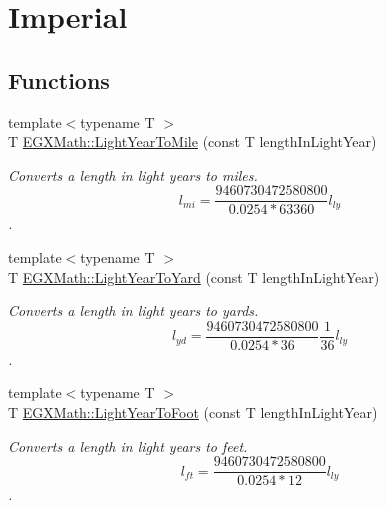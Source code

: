 \hypertarget{group___e_g_x_math-_conversions-_length_conversions-_astronomical-_light_year-_imperial}{}\section{Imperial}
\label{group___e_g_x_math-_conversions-_length_conversions-_astronomical-_light_year-_imperial}
\subsection*{Functions}
\begin{DoxyCompactItemize}
\item 
{\footnotesize template$<$typename T $>$ }\\T \mbox{\hyperlink{group___e_g_x_math-_conversions-_length_conversions-_astronomical-_light_year-_imperial_ga3f6a914c8896334f1be6425107a34827}{E\+G\+X\+Math\+::\+Light\+Year\+To\+Mile}} (const T length\+In\+Light\+Year)
\begin{DoxyCompactList}\small\item\em Converts a length in light years to miles. \[ l_{mi}=\frac{9460730472580800}{0.0254 * 63360} l_{ly} \]. \end{DoxyCompactList}\item 
{\footnotesize template$<$typename T $>$ }\\T \mbox{\hyperlink{group___e_g_x_math-_conversions-_length_conversions-_astronomical-_light_year-_imperial_ga78ce9f584c98c3ad8c4daaebb76030d3}{E\+G\+X\+Math\+::\+Light\+Year\+To\+Yard}} (const T length\+In\+Light\+Year)
\begin{DoxyCompactList}\small\item\em Converts a length in light years to yards. \[ l_{yd}= \frac{9460730472580800}{0.0254 * 36} \frac{1}{36} l_{ly} \]. \end{DoxyCompactList}\item 
{\footnotesize template$<$typename T $>$ }\\T \mbox{\hyperlink{group___e_g_x_math-_conversions-_length_conversions-_astronomical-_light_year-_imperial_gac1d171820f3a01eac5bcb514932a3a17}{E\+G\+X\+Math\+::\+Light\+Year\+To\+Foot}} (const T length\+In\+Light\+Year)
\begin{DoxyCompactList}\small\item\em Converts a length in light years to feet. \[ l_{ft}= \frac{9460730472580800}{0.0254 * 12} l_{ly} \]. \end{DoxyCompactList}\item 

\end{DoxyCompactItemize}
